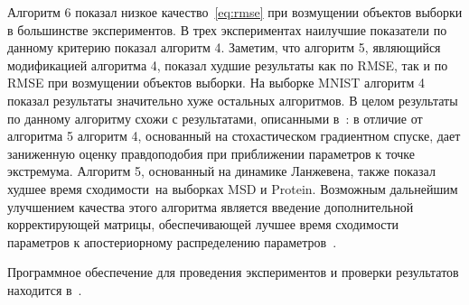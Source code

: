 Алгоритм 6 показал низкое качество~\eqref{eq:rmse} при возмущении объектов выборки {в большинстве экспериментов}. В {трех} экспериментах наилучшие показатели по данному критерию показал алгоритм 4. Заметим, что алгоритм 5, являющийся модификацией алгоритма 4, показал худшие результаты как по RMSE, так и по RMSE при возмущении объектов выборки. 
{На выборке MNIST алгоритм 4 показал результаты значительно хуже остальных алгоритмов. В целом результаты по данному алгоритму схожи с результатами, описанными в~\cite{early}: в отличие от алгоритма 5 алгоритм 4, основанный на стохастическом градиентном спуске, дает заниженную оценку правдоподобия при приближении параметров к точке экстремума. } Алгоритм 5, основанный на динамике Ланжевена, также показал худшее время сходимости~{на выборках MSD и Protein}. Возможным дальнейшим улучшением качества этого алгоритма является введение дополнительной корректирующей матрицы, обеспечивающей лучшее время сходимости параметров к апостериорному распределению параметров~\cite{langevin}.

Программное обеспечение для проведения экспериментов и проверки результатов  находится в~\cite{my_src}. 











